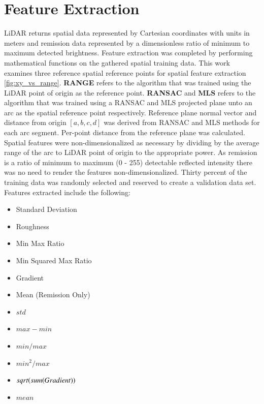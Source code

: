 \documentclass[numbered,pdftex]{ohio-etd}
\begin{document}
{{	} %
	
	\section{Feature Extraction}\label{sec:Feat_Extract} {
	
		{LiDAR returns spatial data represented by Cartesian coordinates with units in meters and remission data represented by a dimensionless ratio of minimum to maximum detected brightness. Feature extraction was completed by performing mathematical functions on the gathered spatial training data. This work examines three reference spatial reference points for spatial feature extraction \ref{fig:xy_vs_range}. \textbf{RANGE} refers to the algorithm that was trained using the LiDAR point of origin as the reference point. \textbf{RANSAC} and \textbf{MLS} refers to the algorithm that was trained using a RANSAC and MLS projected plane unto an arc as the spatial reference point respectively. Reference plane normal vector and distance from origin $[a,b,c,d]$ was derived from RANSAC and MLS methods for each arc segment. Per-point distance from the reference plane was calculated. Spatial features were non-dimensionalized as necessary by dividing by the average range of the arc to LiDAR point of origin to the appropriate power. As remission is a ratio of minimum to maximum (0 - 255) detectable reflected intensity there was no need to render the features non-dimensionalized. Thirty percent of the training data was randomly selected and reserved to create a validation data set. Features extracted include the following:}
		
		\begin{multicols}{2}
			\begin{itemize}[itemsep=.1pt]
				\item Standard Deviation
				\item Roughness
				\item Min Max Ratio
				\item Min Squared Max Ratio
				\item Gradient
				\item Mean (Remission Only)
			\end{itemize}
			\vfill\null
			\columnbreak
			\begin{itemize}[itemsep=.1pt]
				\item $std$
				\item $max - min$
				\item $min / max$
				\item $min^2 / max$
				\item $sqrt(sum(Gradient\*))$
				\item $mean$
			\end{itemize}
			\vfill\null
			\label{lst:feature_list}
		\end{multicols}
		
}}
\end{document}
